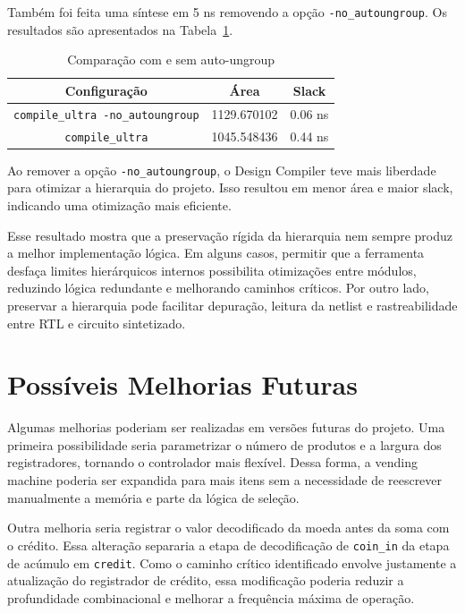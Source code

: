 \documentclass[11pt,a4paper]{article}
\begin{document}
Também foi feita uma síntese em 5 ns removendo a opção \texttt{-no\_autoungroup}. Os resultados são apresentados na Tabela~\ref{tab:autoungroup}.

\begin{table}[H]
\centering
\caption{Comparação com e sem auto-ungroup}
\label{tab:autoungroup}
\begin{tabular}{ccc}
\toprule
\textbf{Configuração} & \textbf{Área} & \textbf{Slack} \\
\midrule
\texttt{compile\_ultra -no\_autoungroup} & 1129.670102 & 0.06 ns \\
\texttt{compile\_ultra} & 1045.548436 & 0.44 ns \\
\bottomrule
\end{tabular}
\end{table}

Ao remover a opção \texttt{-no\_autoungroup}, o Design Compiler teve mais liberdade para otimizar a hierarquia do projeto. Isso resultou em menor área e maior slack, indicando uma otimização mais eficiente.

Esse resultado mostra que a preservação rígida da hierarquia nem sempre produz a melhor implementação lógica. Em alguns casos, permitir que a ferramenta desfaça limites hierárquicos internos possibilita otimizações entre módulos, reduzindo lógica redundante e melhorando caminhos críticos. Por outro lado, preservar a hierarquia pode facilitar depuração, leitura da netlist e rastreabilidade entre RTL e circuito sintetizado.

\section{Possíveis Melhorias Futuras}

Algumas melhorias poderiam ser realizadas em versões futuras do projeto. Uma primeira possibilidade seria parametrizar o número de produtos e a largura dos registradores, tornando o controlador mais flexível. Dessa forma, a vending machine poderia ser expandida para mais itens sem a necessidade de reescrever manualmente a memória e parte da lógica de seleção.

Outra melhoria seria registrar o valor decodificado da moeda antes da soma com o crédito. Essa alteração separaria a etapa de decodificação de \texttt{coin\_in} da etapa de acúmulo em \texttt{credit}. Como o caminho crítico identificado envolve justamente a atualização do registrador de crédito, essa modificação poderia reduzir a profundidade combinacional e melhorar a frequência máxima de operação.
\end{document}
